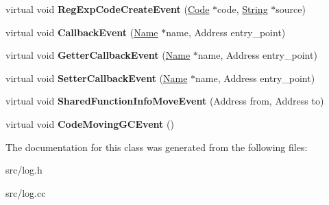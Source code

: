 \begin{DoxyCompactItemize}
\item 
\hypertarget{classv8_1_1internal_1_1_code_event_logger_a97192e4d354e3263d8138e408952b689}{}virtual void {\bfseries Reg\+Exp\+Code\+Create\+Event} (\hyperlink{classv8_1_1internal_1_1_code}{Code} $\ast$code, \hyperlink{classv8_1_1internal_1_1_string}{String} $\ast$source)\label{classv8_1_1internal_1_1_code_event_logger_a97192e4d354e3263d8138e408952b689}

\item 
\hypertarget{classv8_1_1internal_1_1_code_event_logger_affe112ece42632db531f3d3a08adeb08}{}virtual void {\bfseries Callback\+Event} (\hyperlink{classv8_1_1internal_1_1_name}{Name} $\ast$name, Address entry\+\_\+point)\label{classv8_1_1internal_1_1_code_event_logger_affe112ece42632db531f3d3a08adeb08}

\item 
\hypertarget{classv8_1_1internal_1_1_code_event_logger_afd251b4c5be8d1c1b131b2174fa888d6}{}virtual void {\bfseries Getter\+Callback\+Event} (\hyperlink{classv8_1_1internal_1_1_name}{Name} $\ast$name, Address entry\+\_\+point)\label{classv8_1_1internal_1_1_code_event_logger_afd251b4c5be8d1c1b131b2174fa888d6}

\item 
\hypertarget{classv8_1_1internal_1_1_code_event_logger_a52604fd4ab5cde3c85c79bb7f68e0e15}{}virtual void {\bfseries Setter\+Callback\+Event} (\hyperlink{classv8_1_1internal_1_1_name}{Name} $\ast$name, Address entry\+\_\+point)\label{classv8_1_1internal_1_1_code_event_logger_a52604fd4ab5cde3c85c79bb7f68e0e15}

\item 
\hypertarget{classv8_1_1internal_1_1_code_event_logger_a9f033f8366fc261a6effdf0a5ffa3391}{}virtual void {\bfseries Shared\+Function\+Info\+Move\+Event} (Address from, Address to)\label{classv8_1_1internal_1_1_code_event_logger_a9f033f8366fc261a6effdf0a5ffa3391}

\item 
\hypertarget{classv8_1_1internal_1_1_code_event_logger_aed83aa3be36c369aee99908a15f404c1}{}virtual void {\bfseries Code\+Moving\+G\+C\+Event} ()\label{classv8_1_1internal_1_1_code_event_logger_aed83aa3be36c369aee99908a15f404c1}

\end{DoxyCompactItemize}


The documentation for this class was generated from the following files\+:\begin{DoxyCompactItemize}
\item 
src/log.\+h\item 
src/log.\+cc\end{DoxyCompactItemize}
